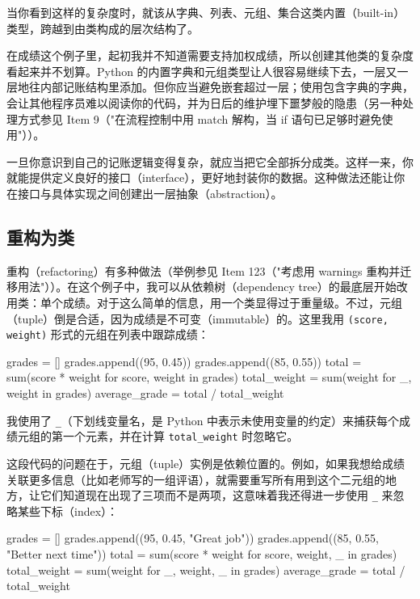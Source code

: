 当你看到这样的复杂度时，就该从字典、列表、元组、集合这类内置（built-in）类型，跨越到由类构成的层次结构了。

在成绩这个例子里，起初我并不知道需要支持加权成绩，所以创建其他类的复杂度看起来并不划算。Python 的内置字典和元组类型让人很容易继续下去，一层又一层地往内部记账结构里添加。但你应当避免嵌套超过一层；使用包含字典的字典，会让其他程序员难以阅读你的代码，并为日后的维护埋下噩梦般的隐患（另一种处理方式参见 Item 9（"在流程控制中用 match 解构，当 if 语句已足够时避免使用"））。

一旦你意识到自己的记账逻辑变得复杂，就应当把它全部拆分成类。这样一来，你就能提供定义良好的接口（interface），更好地封装你的数据。这种做法还能让你在接口与具体实现之间创建出一层抽象（abstraction）。

\subsection{重构为类}

重构（refactoring）有多种做法（举例参见 Item 123（"考虑用 warnings 重构并迁移用法"））。在这个例子中，我可以从依赖树（dependency tree）的最底层开始改用类：单个成绩。对于这么简单的信息，用一个类显得过于重量级。不过，元组（tuple）倒是合适，因为成绩是不可变（immutable）的。这里我用 \texttt{(score, weight)} 形式的元组在列表中跟踪成绩：

\begin{codebox}[python]
grades = []
grades.append((95, 0.45))
grades.append((85, 0.55))
total = sum(score * weight for score, weight in grades)
total_weight = sum(weight for _, weight in grades)
average_grade = total / total_weight
\end{codebox}

我使用了 \texttt{\_}（下划线变量名，是 Python 中表示未使用变量的约定）来捕获每个成绩元组的第一个元素，并在计算 \texttt{total\_weight} 时忽略它。

这段代码的问题在于，元组（tuple）实例是依赖位置的。例如，如果我想给成绩关联更多信息（比如老师写的一组评语），就需要重写所有用到这个二元组的地方，让它们知道现在出现了三项而不是两项，这意味着我还得进一步使用 \texttt{\_} 来忽略某些下标（index）：

\begin{codebox}[python]
grades = []
grades.append((95, 0.45, "Great job"))
grades.append((85, 0.55, "Better next time"))
total = sum(score * weight for score, weight, _ in grades)
total_weight = sum(weight for _, weight, _ in grades)
average_grade = total / total_weight
\end{codebox}

